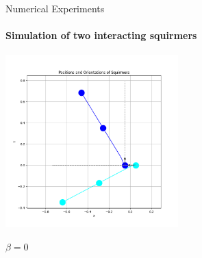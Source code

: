 \documentclass{beamer}
\begin{document}
\begin{frame}{Numerical Experiments}
    \framesubtitle{Simulation of two interacting squirmers}
    \centering
    \includegraphics[width=0.5\textwidth]{../../graphs/simulations/sim_sq_sq/beta0/pi_.png}
    \begin{center}
        $\beta = 0$
    \end{center}
\end{frame}
\end{document}
